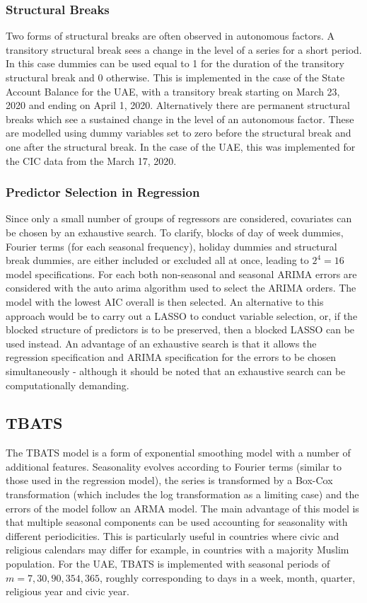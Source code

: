\subsubsection{Structural Breaks}

Two forms of structural breaks are often observed in autonomous factors. A transitory structural break sees a change in the level of a series for a short period. In this case dummies can be used equal to 1 for the duration of the transitory structural break and 0 otherwise. This is implemented in the case of the State Account Balance for the UAE, with a transitory break starting on March 23, 2020 and ending on April 1, 2020. Alternatively there are permanent structural breaks which see a sustained change in the level of an autonomous factor. These are modelled using dummy variables set to zero before the structural break and one after the structural break. In the case of the UAE, this was implemented for the CIC data from the March 17, 2020.

\subsubsection{Predictor Selection in Regression}

Since only a small number of groups of regressors are considered, covariates can be chosen by an exhaustive search. To clarify, blocks of day of week dummies, Fourier terms (for each seasonal frequency), holiday dummies and structural break dummies, are either included or excluded all at once, leading to $2^4=16$ model specifications. For each both non-seasonal and seasonal ARIMA errors are considered with the auto arima algorithm used to select the ARIMA orders. The model with the lowest AIC overall is then selected. An alternative to this approach would be to carry out a LASSO to conduct variable selection, or, if the blocked structure of predictors is to be preserved, then a blocked LASSO can be used instead. An advantage of an exhaustive search is that it allows the regression specification and ARIMA specification for the errors to be chosen simultaneously - although it should be noted that an exhaustive search can be computationally demanding.

\subsection{TBATS}

The TBATS model \citep{DeLEtAl2011} is a form of exponential smoothing model with a number of additional features. Seasonality evolves according to Fourier terms (similar to those used in the regression model), the series is transformed by a Box-Cox transformation (which includes the log transformation as a limiting case) and the errors of the model follow an ARMA model. The main advantage of this model is that multiple seasonal components can be used accounting for seasonality with different periodicities. This is particularly useful in countries where civic and religious calendars may differ for example, in countries with a majority Muslim population. For the UAE, TBATS is implemented with seasonal periods of $m=7,30,90,354,365$, roughly corresponding to days in a week, month, quarter, religious year and civic year.

